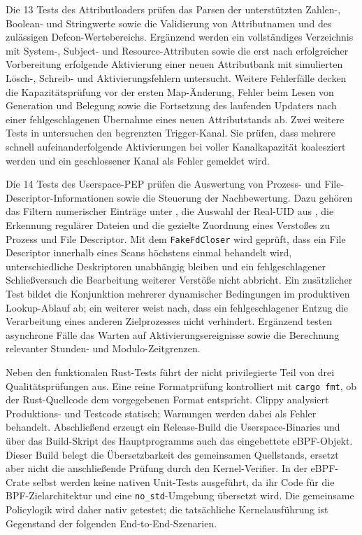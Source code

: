 Die 13 Tests des Attributloaders prüfen das Parsen der unterstützten Zahlen-, Boolean- und
Stringwerte sowie die Validierung von Attributnamen und des zulässigen Defcon-Wertebereichs.
Ergänzend werden ein vollständiges Verzeichnis mit System-, Subject- und Resource-Attributen sowie
die erst nach erfolgreicher Vorbereitung erfolgende Aktivierung einer neuen Attributbank mit simulierten Lösch-, Schreib- und
Aktivierungsfehlern untersucht. Weitere Fehlerfälle decken die Kapazitätsprüfung vor der ersten
Map-Änderung, Fehler beim Lesen von Generation und Belegung sowie die Fortsetzung des laufenden
Updaters nach einer fehlgeschlagenen Übernahme eines neuen Attributstands ab. Zwei
weitere Tests in  untersuchen den begrenzten Trigger-Kanal. Sie
prüfen, dass mehrere schnell aufeinanderfolgende Aktivierungen bei voller Kanalkapazität
koalesziert werden und ein geschlossener Kanal als Fehler gemeldet wird.

Die 14 Tests des Userspace-PEP prüfen die Auswertung von Prozess- und
File-Descriptor-Informationen sowie die Steuerung der Nachbewertung. Dazu gehören das Filtern
numerischer Einträge unter , die Auswahl der Real-UID aus
\mbox{}, die Erkennung regulärer Dateien und die gezielte Zuordnung eines
Verstoßes zu Prozess und File Descriptor. Mit dem \texttt{FakeFdCloser} wird geprüft, dass ein
File Descriptor innerhalb eines Scans höchstens einmal behandelt wird, unterschiedliche
Deskriptoren unabhängig bleiben und ein fehlgeschlagener Schließversuch die Bearbeitung weiterer
Verstöße nicht abbricht. Ein zusätzlicher Test bildet die Konjunktion mehrerer dynamischer
Bedingungen im produktiven Lookup-Ablauf ab; ein weiterer weist nach, dass ein fehlgeschlagener
Entzug die Verarbeitung eines anderen Zielprozesses nicht verhindert. Ergänzend testen asynchrone
Fälle das Warten auf Aktivierungsereignisse sowie die Berechnung relevanter Stunden- und
Modulo-Zeitgrenzen.

Neben den funktionalen Rust-Tests führt der nicht privilegierte Teil von  drei
Qualitätsprüfungen aus. Eine reine
Formatprüfung kontrolliert mit \texttt{cargo fmt}, ob der Rust-Quellcode dem vorgegebenen Format
entspricht. Clippy analysiert Produktions- und Testcode statisch; Warnungen werden dabei als
Fehler behandelt. Abschließend erzeugt ein Release-Build die Userspace-Binaries und über das
Build-Skript des Hauptprogramms auch das eingebettete eBPF-Objekt. Dieser Build belegt die
Übersetzbarkeit des gemeinsamen Quellstands, ersetzt aber nicht die anschließende Prüfung durch
den Kernel-Verifier. In der eBPF-Crate selbst werden keine nativen Unit-Tests ausgeführt, da ihr
Code für die BPF-Zielarchitektur und eine \texttt{no\_std}-Umgebung übersetzt wird. Die
gemeinsame Policylogik wird daher nativ getestet; die tatsächliche Kernelausführung ist
Gegenstand der folgenden End-to-End-Szenarien.

